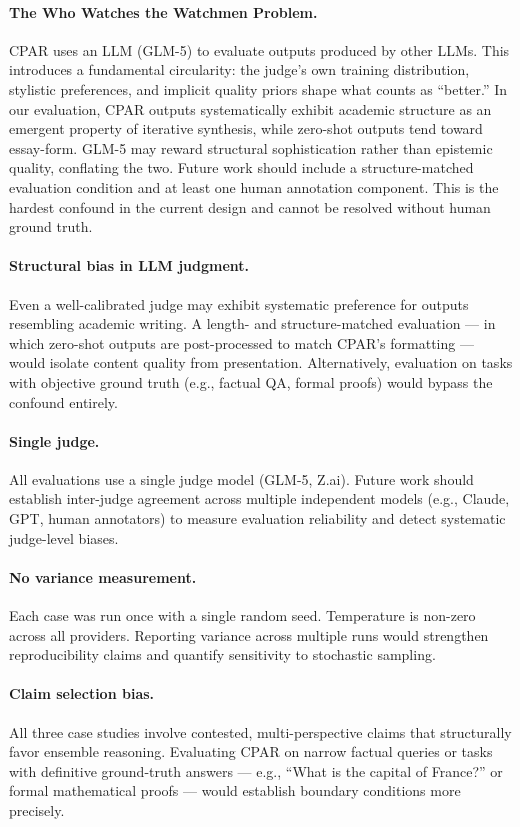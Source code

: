 \documentclass[11pt, a4paper]{article}
\begin{document}
\paragraph{The Who Watches the Watchmen Problem.} CPAR uses an LLM (GLM-5) to evaluate outputs produced by other LLMs. This introduces a fundamental circularity: the judge's own training distribution, stylistic preferences, and implicit quality priors shape what counts as ``better.'' In our evaluation, CPAR outputs systematically exhibit academic structure as an emergent property of iterative synthesis, while zero-shot outputs tend toward essay-form. GLM-5 may reward structural sophistication rather than epistemic quality, conflating the two. Future work should include a structure-matched evaluation condition and at least one human annotation component. This is the hardest confound in the current design and cannot be resolved without human ground truth.

\paragraph{Structural bias in LLM judgment.} Even a well-calibrated judge may exhibit systematic preference for outputs resembling academic writing. A length- and structure-matched evaluation --- in which zero-shot outputs are post-processed to match CPAR's formatting --- would isolate content quality from presentation. Alternatively, evaluation on tasks with objective ground truth (e.g., factual QA, formal proofs) would bypass the confound entirely.

\paragraph{Single judge.} All evaluations use a single judge model (GLM-5, Z.ai). Future work should establish inter-judge agreement across multiple independent models (e.g., Claude, GPT, human annotators) to measure evaluation reliability and detect systematic judge-level biases.

\paragraph{No variance measurement.} Each case was run once with a single random seed. Temperature is non-zero across all providers. Reporting variance across multiple runs would strengthen reproducibility claims and quantify sensitivity to stochastic sampling.

\paragraph{Claim selection bias.} All three case studies involve contested, multi-perspective claims that structurally favor ensemble reasoning. Evaluating CPAR on narrow factual queries or tasks with definitive ground-truth answers --- e.g., ``What is the capital of France?'' or formal mathematical proofs --- would establish boundary conditions more precisely.
\end{document}
